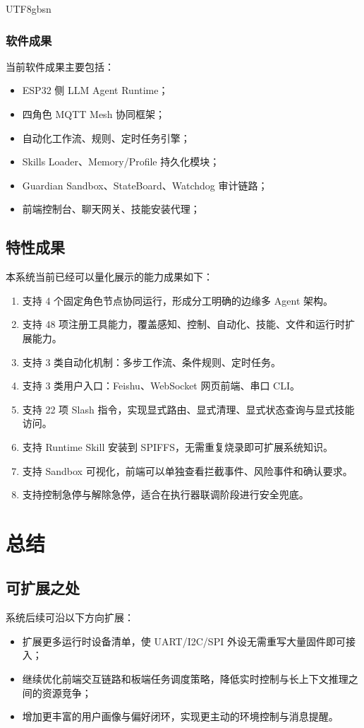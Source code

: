 \documentclass[a4paper,12pt]{article}
\begin{document}
\begin{CJK*}{UTF8}{gbsn}
\subsubsection{软件成果}
当前软件成果主要包括：
\begin{itemize}
  \item ESP32 侧 LLM Agent Runtime；
  \item 四角色 MQTT Mesh 协同框架；
  \item 自动化工作流、规则、定时任务引擎；
  \item Skills Loader、Memory/Profile 持久化模块；
  \item Guardian Sandbox、StateBoard、Watchdog 审计链路；
  \item 前端控制台、聊天网关、技能安装代理；
\end{itemize}

\subsection{特性成果}
本系统当前已经可以量化展示的能力成果如下：
\begin{enumerate}
  \item 支持 4 个固定角色节点协同运行，形成分工明确的边缘多 Agent 架构。
  \item 支持 48 项注册工具能力，覆盖感知、控制、自动化、技能、文件和运行时扩展能力。
  \item 支持 3 类自动化机制：多步工作流、条件规则、定时任务。
  \item 支持 3 类用户入口：Feishu、WebSocket 网页前端、串口 CLI。
  \item 支持 22 项 Slash 指令，实现显式路由、显式清理、显式状态查询与显式技能访问。
  \item 支持 Runtime Skill 安装到 SPIFFS，无需重复烧录即可扩展系统知识。
  \item 支持 Sandbox 可视化，前端可以单独查看拦截事件、风险事件和确认要求。
  \item 支持控制急停与解除急停，适合在执行器联调阶段进行安全兜底。
\end{enumerate}

\section{总结}

\subsection{可扩展之处}
系统后续可沿以下方向扩展：
\begin{itemize}
  \item 扩展更多运行时设备清单，使 UART/I2C/SPI 外设无需重写大量固件即可接入；
  \item 继续优化前端交互链路和板端任务调度策略，降低实时控制与长上下文推理之间的资源竞争；
  \item 增加更丰富的用户画像与偏好闭环，实现更主动的环境控制与消息提醒。
\end{itemize}


\end{CJK*}
\end{document}

